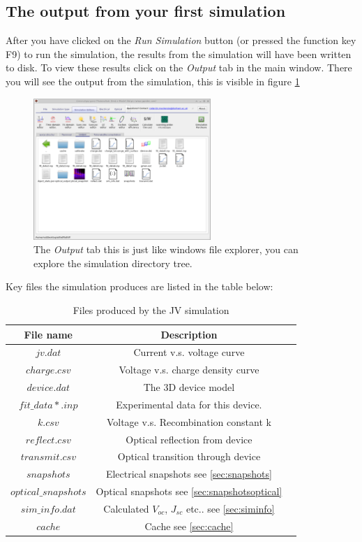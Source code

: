 \pagebreak
\subsection{The output from your first simulation}

After you have clicked on the \emph{Run Simulation} button (or pressed the function key F9) to run the simulation, the results from the simulation will have been written to disk. To view these results click on the \emph{Output} tab in the main window. There you will see the output from the simulation, this is visible in figure \ref{fig:output}
\begin{figure}[H]
\centering
\includegraphics[width=0.6\textwidth,height=0.5\textwidth]{./images/running/output.png}
\caption{The \emph{Output} tab this is just like windows file explorer, you can explore the simulation directory tree.}
\label{fig:output}
\end{figure}


Key files the simulation produces are listed in the table below:

\begin{table}[H]
\begin{center}
\begin{tabular}{ |c|c|c| } 
 \hline
	File name 			& 	Description  \\ 
 \hline
	$jv.dat$ 			&	Current v.s. voltage curve \\ 
	$charge.csv$ 		&	Voltage v.s. charge density curve\\ 
	$device.dat$ 		&	The 3D device model\\ 
	$fit\_data*.inp$ 	&	Experimental data for this device.\\
	$k.csv$ 			&	Voltage v.s. Recombination constant k\\ 
	$reflect.csv$ 		&	Optical reflection from device\\ 
	$transmit.csv$ 		&	Optical transition through device\\ 
	$snapshots$ 		&	Electrical snapshots see \ref{sec:snapshots}\\
	$optical\_snapshots$&	Optical snapshots see \ref{sec:snapshotsoptical} \\
	$sim\_info.dat$ 	&	Calculated $V_{oc}$, $J_{sc}$ etc.. see \ref{sec:siminfo}   \\
	$cache$ 			&	Cache see \ref{sec:cache}  \\
 \hline
\end{tabular}
\caption{Files produced by the JV simulation}
\label{fig:output}
\end{center}
\end{table}

